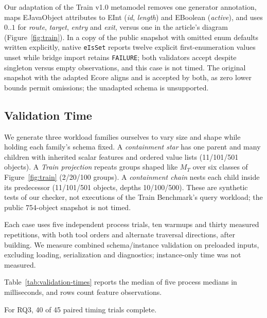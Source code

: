 Our adaptation of the Train v1.0 metamodel removes one generator annotation,
maps EJavaObject attributes to EInt (\emph{id}, \emph{length}) and EBoolean
(\emph{active}), and uses $0..1$ for \emph{route}, \emph{target}, \emph{entry}
and \emph{exit}, versus one in the article's diagram (Figure~\ref{fig:train}).
In a copy of the public snapshot with omitted enum defaults written explicitly,
native \texttt{eIsSet} reports twelve explicit first-enumeration values unset
while bridge import retains \texttt{FAILURE}; both validators accept despite
singleton versus empty observations, and this case is not timed. The original
snapshot with the adapted Ecore aligns and is accepted by both, as zero lower
bounds permit omissions; the unadapted schema is unsupported.

\subsection{Validation Time}\label{sec:timing}
We generate three workload families ourselves to vary size and shape while
holding each family's schema fixed. A \emph{containment star} has one parent
and many children with inherited scalar features and ordered value lists
(11/101/501 objects). A \emph{Train projection} repeats groups shaped like
$M_T$ over six classes of Figure~\ref{fig:train} (2/20/100 groups). A
\emph{containment chain} nests each child inside its predecessor
(11/101/501 objects, depths 10/100/500). These are synthetic tests of our checker,
not executions of the Train Benchmark's query workload; the public 754-object
snapshot is not timed.

Each case uses five independent process trials, ten warmups and thirty measured
repetitions, with both tool orders and alternate traversal directions, after building. We
measure combined schema/instance validation on preloaded inputs, excluding
loading, serialization and diagnostics; instance-only time was not measured.

Table~\ref{tab:validation-times} reports the median of five process medians
in milliseconds, and rows count feature observations.


For RQ3, 40 of 45 paired timing trials complete.

